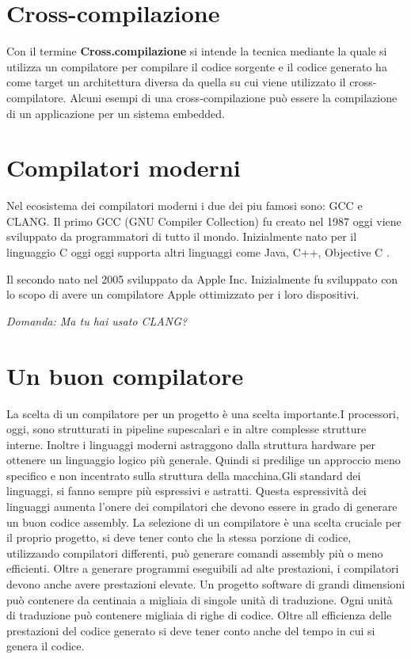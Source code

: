 \documentclass[12pt,a4paper]{report}
\begin{document}



\section{Cross-compilazione}
\label{Sec:Cross}
Con il termine \textbf{Cross.compilazione} si intende la tecnica mediante la quale si utilizza un compilatore per compilare il codice sorgente e il codice generato ha come target un architettura diversa da quella su cui viene utilizzato il cross-compilatore.  Alcuni esempi di una cross-compilazione può essere la compilazione di un applicazione per un sistema embedded. 


\section{Compilatori moderni}
Nel ecosistema dei compilatori moderni i due dei piu famosi sono: GCC e CLANG.
Il primo GCC (GNU Compiler Collection) fu creato nel 1987 oggi viene sviluppato da programmatori di tutto il mondo. Inizialmente nato per il linguaggio C oggi oggi supporta altri linguaggi come Java, C++, Objective C \cite{GCCstory}.

Il secondo nato nel 2005 sviluppato da Apple Inc.  Inizialmente fu sviluppato con lo scopo di avere un compilatore Apple ottimizzato per i loro dispositivi\cite{ClangStory}.

\textit{Domanda: Ma tu hai usato CLANG?} 

\section{Un buon compilatore} %
La scelta di un compilatore per un progetto è una scelta importante.I processori, oggi, sono strutturati in pipeline supescalari e in altre complesse strutture interne. Inoltre i linguaggi moderni astraggono dalla struttura hardware per ottenere un linguaggio logico più generale. Quindi si predilige un approccio meno specifico e non incentrato sulla struttura della macchina.Gli standard dei linguaggi, si fanno  sempre più espressivi e astratti.  Questa espressività dei linguaggi aumenta l'onere dei compilatori che devono essere in grado di generare un buon codice assembly. La selezione di un compilatore è una scelta cruciale per il proprio progetto, si deve tener conto che la stessa porzione di codice, utilizzando compilatori differenti, può generare comandi assembly più o meno efficienti.
Oltre a generare programmi eseguibili ad alte prestazioni, i compilatori devono anche avere prestazioni elevate. Un progetto software di grandi dimensioni  può contenere da centinaia a migliaia di singole unità di traduzione. Ogni unità di traduzione può contenere migliaia di righe di codice.  Oltre all efficienza delle prestazioni del codice generato si deve tener conto anche del tempo in cui si genera il codice.
\end{document}
